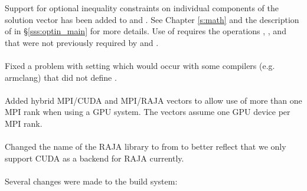 Support for optional inequality constraints on individual components of the
solution vector has been added to {\cvode} and {\cvodes}. See Chapter
\ref{s:math} and the description of  in
\S\ref{sss:optin_main} for more details. Use of 
requires the {\nvector} operations , , and
 that were not previously required by {\cvode} and {\cvodes}.
\\
\\
\noindent Fixed a problem with setting  which would occur
with some compilers (e.g. armclang) that did not define .
\\
\\
\noindent Added hybrid MPI/CUDA and MPI/RAJA vectors to allow use of more 
than one MPI rank when using a GPU system.  The vectors assume one GPU 
device per MPI rank.
\\
\\
\noindent Changed the name of the RAJA {\nvector} library to
 from \newline
{} to better reflect that we only support CUDA
as a backend for RAJA currently.
\\
\\
\noindent Several changes were made to the build system:
